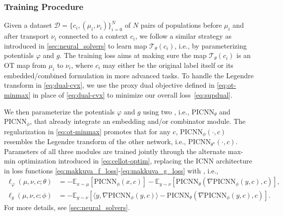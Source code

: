 \subsubsection{Training Procedure}

 Given a dataset $\mathcal{D}=\{c_i, (\mu_i, \nu_i) \}_{i=0}^N$ of $N$ pairs of populations before $\mu_i$ and after transport $\nu_i$ connected to a context $c_i$, we follow a similar strategy as introduced in \cref{sec:neural_solvers} to learn map $\mathcal{T}_\theta(c_i)$, i.e., by parameterizing potentials $\varphi$ and $g$. 
The training loss aims at making sure the map $\mathcal{T}_\theta(c_i)$ is an \acrshort{OT} map from $\mu_i$ to $\nu_i$, where $c_i$ may either be the original label itself or its embedded/combined formulation in more advanced tasks. To handle the Legendre transform in \eqref{eq:dual-cvx}, we use the proxy dual objective defined in \eqref{eq:ot-minmax} \citep{makkuva2020optimal} in place of \eqref{eq:dual-cvx} to minimize our overall loss~\eqref{eq:supdual}.

We then parameterize the potentials $\varphi$ and $g$ using two , i.e., $\text{PICNN}_{\theta}$ and $\text{PICNN}_{\phi}$, that already integrate an embedding and/or combinator module. The regularization in \eqref{eq:ot-minmax} promotes that for any $c$, $\text{PICNN}_{\phi}(\cdot,c)$ resembles the Legendre transform of the other network, i.e., $\text{PICNN}_{\theta^\star}(\cdot,c)$.
Parameters of all three modules are trained jointly through the alternate max-min optimization introduced in \eqref{eq:cellot-optim}, replacing the \acrshort{ICNN} architecture in loss functions \eqref{eq:makkuva_f_loss}-\eqref{eq:makkuva_g_loss} with , i.e.,
\begin{align*} 
    \ell_\varphi(\mu, \nu, c; \theta) &= -\mathbb{E}_{x \sim \mu}[\text{PICNN}_{\phi}(x, c)] - \mathbb{E}_{y \sim \nu}[\text{PICNN}_{\theta}(\nabla \text{PICNN}_{\phi}(y, c), c)], \\
    \ell_g(\mu, \nu, c; \phi) &= -\mathbb{E}_{y \sim \nu}[\langle y, \nabla \text{PICNN}_{\phi}(y, c)\rangle-\text{PICNN}_{\theta}(\nabla \text{PICNN}_{\phi}(y, c), c)].
\end{align*}
For more details, see \cref{sec:neural_solvers}.

